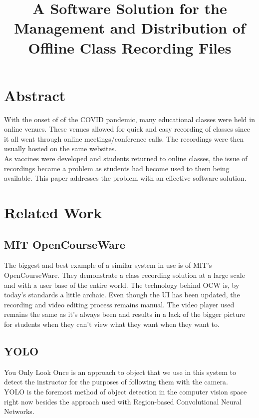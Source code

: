 \documentclass[12pt, conference]{IEEEtran}
\begin{document}
\title{A Software Solution for the Management and Distribution of Offline Class Recording Files}

\author{
}

\maketitle

\section{Abstract}
With the onset of of the COVID pandemic, many educational classes were held in online venues. These venues allowed for quick and easy recording of classes since it all went through online meetings/conference calls. The recordings were then usually hosted on the same websites.\\
As vaccines were developed and students returned to online classes, the issue of recordings became a problem as students had become used to them being available. This paper addresses the problem with an effective software solution.


\section{Related Work}
\subsection{MIT OpenCourseWare \cite{b1}}
The biggest and best example of a similar system in use is of MIT's OpenCourseWare. They demonstrate a class recording solution at a large scale and with a user base of the entire world.
The technology behind OCW is, by today's standards a little archaic. Even though the UI has been updated, the recording and video editing process remains manual. The video player used remains the same as it's always been and results in a lack of the bigger picture for students when they can't view what they want when they want to.
\subsection{YOLO \cite{b2}}
You Only Look Once is an approach to object that we use in this system to detect the instructor for the purposes of following them with the camera.\\
YOLO is the foremost method of object detection in the computer vision space right now besides the approach used with Region-based Convolutional Neural Networks.
\end{document}
